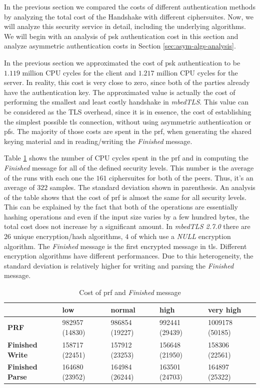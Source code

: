 \documentclass{llncs}
\begin{document}
In the previous section we compared the costs of different authentication methods by analyzing the total cost of the
Handshake with different ciphersuites. Now, we will analyze this security service in detail, including the
underlying algorithms. We will begin with an analysis of \gls{psk} authentication cost in this section and 
analyze asymmetric authentication costs in Section \ref{sec:asym-algs-analysis}.

In the previous section we approximated the cost of \gls{psk} authentication to be $1.119$ million CPU cycles
for the client and $1.217$ million CPU cycles for the server. In reality, this cost is very close to zero, since
both of the parties already have the authentication key. The approximated value is actually the cost of performing the
smallest and least costly handshake in \textit{mbedTLS}.
This value can be considered as the TLS overhead, since it is in essence, the cost of establishing the simplest possible \gls{tls} connection,
without using asymmetric authentication or \gls{pfs}. The majority of those costs are spent in the \gls{prf}, when generating the
shared keying material and in reading/writing the \textit{Finished} message. 

Table \ref{table:hs-key-gen-cost} shows the number of CPU cycles spent in the \gls{prf}
and in computing the \textit{Finished} message for all of the defined security levels.
This number is the average of the runs with each one the $161$ ciphersuites for both of the peers. Thus, it's
an average of $322$ samples. The standard deviation shown in parenthesis.
An analysis of the table shows that the cost of \gls{prf} is almost the same for all security levels. This can be explained by
the fact that both of the operations are essentially hashing operations and even if the input size varies
by a few hundred bytes, the total cost does not increase by a significant amount.
In \textit{mbedTLS 2.7.0} there are $26$ unique encryption/hash algorithms, $4$ of which use a \textit{NULL} encryption algorithm.
The \textit{Finished} message is the first encrypted message in \gls{tls}. Different encryption algorithms have different
performances. Due to this heterogeneity, the standard deviation is relatively higher for writing and parsing the \textit{Finished} message.

\begin{table}[]
\begin{tabular}{|l|l|l|l|l|}
\hline
                        & \textbf{low}   & \textbf{normal} & \textbf{high}  & \textbf{very high} \\ \hline
\textbf{PRF}            & 982957 (14830) & 986854 (19227)  & 992441 (29439) & 1009178 (50185)    \\ \hline
\textbf{Finished Write} & 158717 (22451) & 157912 (23253)  & 156648 (21950) & 158306 (22561)     \\ \hline
\textbf{Finished Parse} & 164680 (23952) & 164984 (26244)  & 163501 (24703) & 164897 (25322)     \\ \hline
\end{tabular}
\centering \caption{\label{table:hs-key-gen-cost} Cost of \gls{prf} and \textit{Finished} message}
\end{table}
\end{document}

